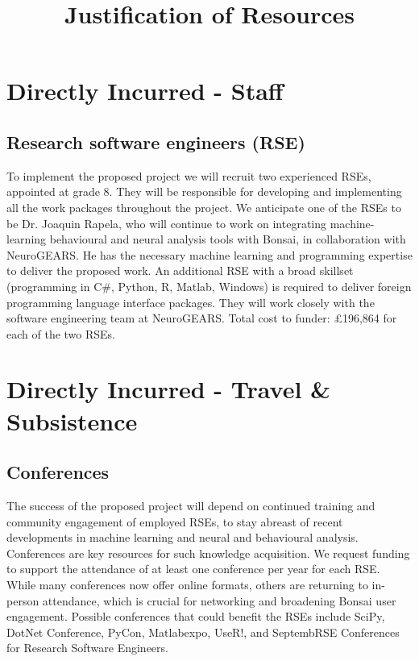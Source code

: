 \documentclass[a4paper,11pt]{article}
\title{Justification of Resources}
\author{}
\date{}
\begin{document}
\maketitle

\section{Directly Incurred - Staff} 

\subsection*{Research software engineers (RSE)}

To implement the proposed project we will recruit two experienced RSEs, appointed
at grade 8. They will be responsible for developing and implementing all the
work packages throughout the project. We anticipate one of the RSEs to be Dr.
Joaquin Rapela, who will continue to work on integrating machine-learning
behavioural and neural analysis tools with Bonsai, in collaboration with
NeuroGEARS. He has the necessary machine learning and programming expertise to
deliver the proposed work. An additional RSE with a broad skillset (programming
in C\#, Python, R, Matlab, Windows) is required to deliver foreign programming language interface packages. They will work closely with the software engineering team at NeuroGEARS. Total cost to funder: £196,864 for each of the two RSEs. 

\section{Directly Incurred - Travel \& Subsistence} 

\subsection*{Conferences}

The success of the proposed project will depend on continued training and community engagement of employed RSEs, to stay abreast of recent developments in machine learning and neural and behavioural analysis. Conferences are key resources for such knowledge acquisition. We request funding to support the attendance of at least one
conference per year for each RSE. While many conferences now offer online formats, others are returning to in-person attendance, which is crucial for networking and broadening Bonsai user engagement. Possible conferences that could benefit the RSEs include SciPy, DotNet Conference, PyCon, Matlabexpo, UseR!, and SeptembRSE Conferences for Research Software Engineers. 
\end{document}
